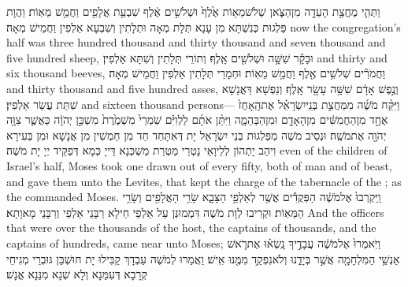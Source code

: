 {וַתְּהִ֛י מֶחֱצַ֥ת הָעֵדָ֖ה מִן\maqqaf הַצֹּ֑אן שְׁלֹשׁ\maqqaf מֵא֥וֹת אֶ֙לֶף֙ וּשְׁלֹשִׁ֣ים אֶ֔לֶף שִׁבְעַ֥ת אֲלָפִ֖ים וַחֲמֵ֥שׁ מֵאֽוֹת׃}
{וַהֲוָת פַּלְגוּת כְּנִשְׁתָּא מִן עָנָא תְּלָת מְאָה וּתְלָתִין וְשִׁבְעָא אַלְפִין וַחֲמֵישׁ מְאָה׃}
{now the congregation’s half was three hundred thousand and thirty thousand and seven thousand and five hundred sheep,}{}
{וּבָקָ֕ר שִׁשָּׁ֥ה וּשְׁלֹשִׁ֖ים אָֽלֶף׃}
{וְתוֹרֵי תְּלָתִין וְשִׁתָּא אַלְפִין׃}
{and thirty and six thousand beeves,}{}
{וַחֲמֹרִ֕ים שְׁלֹשִׁ֥ים אֶ֖לֶף וַחֲמֵ֥שׁ מֵאֽוֹת׃}
{וּחְמָרֵי תְּלָתִין אַלְפִין וַחֲמֵישׁ מְאָה׃}
{and thirty thousand and five hundred asses,}{}
{וְנֶ֣פֶשׁ אָדָ֔ם שִׁשָּׁ֥ה עָשָׂ֖ר אָֽלֶף׃}
{וְנַפְשָׁא דַּאֲנָשָׁא שִׁתַּת עֲשַׂר אַלְפִין׃}
{and sixteen thousand persons—}{}
{וַיִּקַּ֨ח מֹשֶׁ֜ה מִמַּחֲצִ֣ת בְּנֵֽי\maqqaf יִשְׂרָאֵ֗ל אֶת\maqqaf הָֽאָחֻז֙ אֶחָ֣ד מִן\maqqaf הַחֲמִשִּׁ֔ים מִן\maqqaf הָאָדָ֖ם וּמִן\maqqaf הַבְּהֵמָ֑ה וַיִּתֵּ֨ן אֹתָ֜ם לַלְוִיִּ֗ם שֹֽׁמְרֵי֙ מִשְׁמֶ֙רֶת֙ מִשְׁכַּ֣ן יְהֹוָ֔ה כַּאֲשֶׁ֛ר צִוָּ֥ה יְהֹוָ֖ה אֶת\maqqaf מֹשֶֽׁה׃}
{וּנְסֵיב מֹשֶׁה מִפַּלְגוּת בְּנֵי יִשְׂרָאֵל יָת דְּאִתָּחַד חַד מִן חַמְשִׁין מִן אֲנָשָׁא וּמִן בְּעִירָא וִיהַב יָתְהוֹן לְלֵיוָאֵי נָטְרֵי מַטְּרַת מַשְׁכְּנָא דַּייָ כְּמָא דְּפַקֵּיד יְיָ יָת מֹשֶׁה׃}
{even of the children of Israel’s half, Moses took one drawn out of every fifty, both of man and of beast, and gave them unto the Levites, that kept the charge of the tabernacle of the \lord; as the \lord\space commanded Moses.}{}
{וַֽיִּקְרְבוּ֙ אֶל\maqqaf מֹשֶׁ֔ה הַפְּקֻדִ֕ים אֲשֶׁ֖ר לְאַלְפֵ֣י הַצָּבָ֑א שָׂרֵ֥י הָאֲלָפִ֖ים וְשָׂרֵ֥י הַמֵּאֽוֹת׃}
{וּקְרִיבוּ לְוָת מֹשֶׁה דִּמְמוּנַּן עַל אַלְפֵי חֵילָא רַבָּנֵי אַלְפֵי וְרַבָּנֵי מָאוָתָא׃}
{And the officers that were over the thousands of the host, the captains of thousands, and the captains of hundreds, came near unto Moses;}{}
{וַיֹּֽאמְרוּ֙ אֶל\maqqaf מֹשֶׁ֔ה עֲבָדֶ֣יךָ נָֽשְׂא֗וּ אֶת\maqqaf רֹ֛אשׁ אַנְשֵׁ֥י הַמִּלְחָמָ֖ה אֲשֶׁ֣ר בְּיָדֵ֑נוּ וְלֹא\maqqaf נִפְקַ֥ד מִמֶּ֖נּוּ אִֽישׁ׃}
{וַאֲמַרוּ לְמֹשֶׁה עַבְדָךְ קַבִּילוּ יָת חוּשְׁבַּן גּוּבְרֵי מְגִיחֵי קְרָבָא דְּעִמַּנָא וְלָא שְׁגָא מִנַּנָא אֱנָשׁ׃}

